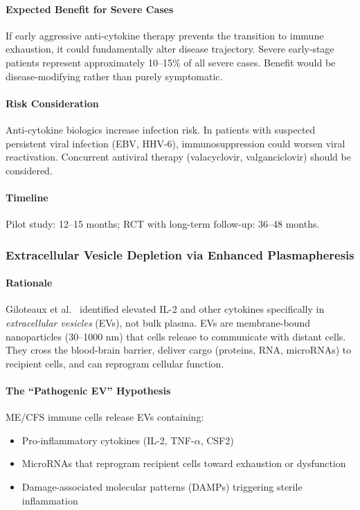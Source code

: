 \paragraph{Expected Benefit for Severe Cases}
If early aggressive anti-cytokine therapy prevents the transition to immune exhaustion, it could fundamentally alter disease trajectory. Severe early-stage patients represent approximately 10--15\% of all severe cases. Benefit would be disease-modifying rather than purely symptomatic.

\paragraph{Risk Consideration}
Anti-cytokine biologics increase infection risk. In patients with suspected persistent viral infection (EBV, HHV-6), immunosuppression could worsen viral reactivation. Concurrent antiviral therapy (valacyclovir, valganciclovir) should be considered.

\paragraph{Timeline}
Pilot study: 12--15 months; RCT with long-term follow-up: 36--48 months.

\subsubsection{Extracellular Vesicle Depletion via Enhanced Plasmapheresis}

\paragraph{Rationale}
Giloteaux et al.~\cite{Giloteaux2023} identified elevated IL-2 and other cytokines specifically in \emph{extracellular vesicles} (EVs), not bulk plasma. EVs are membrane-bound nanoparticles (30--1000 nm) that cells release to communicate with distant cells. They cross the blood-brain barrier, deliver cargo (proteins, RNA, microRNAs) to recipient cells, and can reprogram cellular function.

\paragraph{The ``Pathogenic EV'' Hypothesis}
ME/CFS immune cells release EVs containing:
\begin{itemize}
    \item Pro-inflammatory cytokines (IL-2, TNF-$\alpha$, CSF2)
    \item MicroRNAs that reprogram recipient cells toward exhaustion or dysfunction
    \item Damage-associated molecular patterns (DAMPs) triggering sterile inflammation
\end{itemize}

